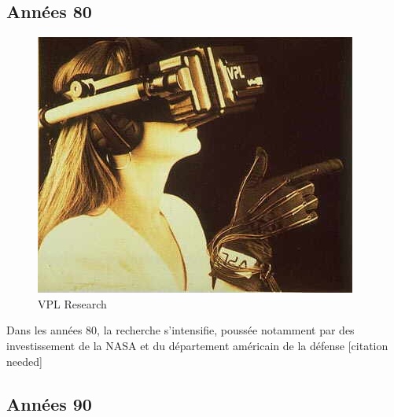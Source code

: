 \documentclass[a4,12pt]{scrartcl}
\begin{document}
\subsection{Années 80}

\begin{figure}[H]
	\centering
	\includegraphics[width=0.6\linewidth]{vpl-hmd}
	\caption{VPL Research}
\end{figure}

Dans les années 80, la recherche s'intensifie, poussée notamment par des investissement de la NASA et du département américain de la défense [citation needed]

\subsection{Années 90}
\end{document}
